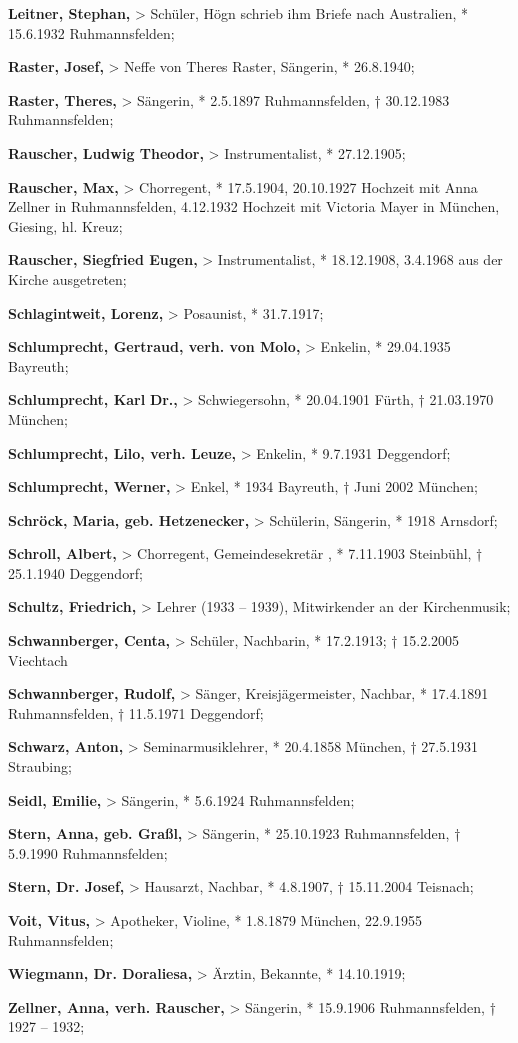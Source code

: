 \textbf{Leitner, Stephan,} {\textgreater} Schüler, Högn schrieb ihm
Briefe nach Australien, * 15.6.1932 Ruhmannsfelden;

\textbf{Raster, Josef,} {\textgreater} Neffe von Theres Raster,
Sängerin, * 26.8.1940;

\textbf{Raster, Theres,} {\textgreater} Sängerin, * 2.5.1897
Ruhmannsfelden, † 30.12.1983 Ruhmannsfelden;

\textbf{Rauscher, Ludwig Theodor,} {\textgreater} Instrumentalist, *
27.12.1905;

\textbf{Rauscher, Max,} {\textgreater} Chorregent, * 17.5.1904,
20.10.1927 Hochzeit mit Anna Zellner in Ruhmannsfelden, 4.12.1932
Hochzeit mit Victoria Mayer in München, Giesing, hl. Kreuz;

\textbf{Rauscher, Siegfried Eugen,} {\textgreater} Instrumentalist, *
18.12.1908, 3.4.1968 aus der Kirche ausgetreten;

\textbf{Schlagintweit, Lorenz,} {\textgreater} Posaunist, * 31.7.1917;

\textbf{Schlumprecht, Gertraud, verh. von Molo,} {\textgreater} Enkelin,
* 29.04.1935 Bayreuth;

\textbf{Schlumprecht, Karl} \textbf{Dr.,} {\textgreater} Schwiegersohn,
* 20.04.1901 Fürth, † 21.03.1970 München;

\textbf{Schlumprecht, Lilo, verh. Leuze,} {\textgreater} Enkelin, *
9.7.1931 Deggendorf;

\textbf{Schlumprecht, Werner,} {\textgreater} Enkel, * 1934 Bayreuth, †
Juni 2002 München;

\textbf{Schröck, Maria, geb. Hetzenecker,} {\textgreater} Schülerin,
Sängerin, * 1918 Arnsdorf;

\textbf{Schroll, Albert, }{\textgreater} Chorregent, Gemeindesekretär
,\textbf{ }* 7.11.1903 Steinbühl,  † 25.1.1940 Deggendorf;

\textbf{Schultz, Friedrich,} {\textgreater} Lehrer (1933 – 1939),
Mitwirkender an der Kirchenmusik;

\textbf{Schwannberger, Centa,} {\textgreater} Schüler, Nachbarin, *
17.2.1913; † 15.2.2005 Viechtach

\textbf{Schwannberger, Rudolf,} {\textgreater} Sänger,
Kreisjägermeister, Nachbar, * 17.4.1891 Ruhmannsfelden, † 11.5.1971
Deggendorf;

\textbf{Schwarz, Anton,} {\textgreater} Seminarmusiklehrer, * 20.4.1858
München, † 27.5.1931 Straubing;

\textbf{Seidl, Emilie,} {\textgreater} Sängerin, * 5.6.1924
Ruhmannsfelden;

\textbf{Stern, Anna, geb. Graßl,} {\textgreater} Sängerin, * 25.10.1923
Ruhmannsfelden, † 5.9.1990 Ruhmannsfelden;

\textbf{Stern, Dr. Josef,} {\textgreater} Hausarzt, Nachbar, * 4.8.1907,
† 15.11.2004 Teisnach;

\textbf{Voit, Vitus,} {\textgreater} Apotheker, Violine, * 1.8.1879
München, 22.9.1955 Ruhmannsfelden;

\textbf{Wiegmann, Dr. Doraliesa,} {\textgreater} Ärztin, Bekannte, *
14.10.1919;

\textbf{Zellner, Anna, verh. Rauscher,} {\textgreater} Sängerin, *
15.9.1906 Ruhmannsfelden, † 1927 – 1932;